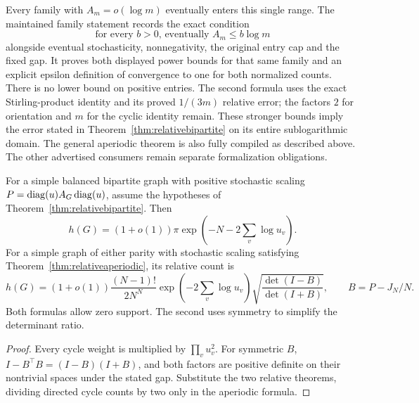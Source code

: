 Every family with \(A_m=o(\log m)\) eventually enters this
single range. The maintained family statement records the exact
condition
\[
 \text{for every }b>0\text{, eventually }A_m\leq b\log m
\]
alongside eventual stochasticity, nonnegativity, the original
entry cap and the fixed gap. It proves both displayed power
bounds for that same family and an explicit epsilon definition
of convergence to one for both normalized counts.
There is no lower bound on positive entries.
The second formula uses the exact Stirling-product identity
and its proved \(1/(3m)\) relative error; the factors \(2\)
for orientation and \(m\) for the cyclic identity remain.
These stronger bounds imply the error stated in
Theorem~\ref{thm:relativebipartite} on its entire sublogarithmic
domain. The general aperiodic theorem is also fully compiled as
described above. The other advertised consumers remain separate
formalization obligations.

\begin{corollary}
\label{cor:relativegraphentropy}
For a simple balanced bipartite graph with positive stochastic
scaling \(P=\operatorname{diag}(u)A_G\operatorname{diag}(u)\), assume the hypotheses of
Theorem~\ref{thm:relativebipartite}.
Then
\[
 h(G)=(1+o(1))\pi
       \exp\left(-N-2\sum_v\log u_v\right).
\]
For a simple graph of either parity with stochastic scaling
satisfying Theorem~\ref{thm:relativeaperiodic}, its relative
count is
\[
 h(G)=(1+o(1))\frac{(N-1)!}{2N^N}
  \exp\left(-2\sum_v\log u_v\right)
           \sqrt{\frac{\det(I-B)}{\det(I+B)}} ,
 \qquad B=P-J_N/N .
\]
Both formulas allow zero support. The second uses symmetry
to simplify the determinant ratio.
\end{corollary}
\begin{proof}
Every cycle weight is multiplied by \(\prod_vu_v^2\).
For symmetric \(B\),
\(I-B^\top B=(I-B)(I+B)\), and both factors are positive
definite on their nontrivial spaces under the stated gap.
Substitute the two relative theorems, dividing directed
cycle counts by two only in the aperiodic formula.
\end{proof}

